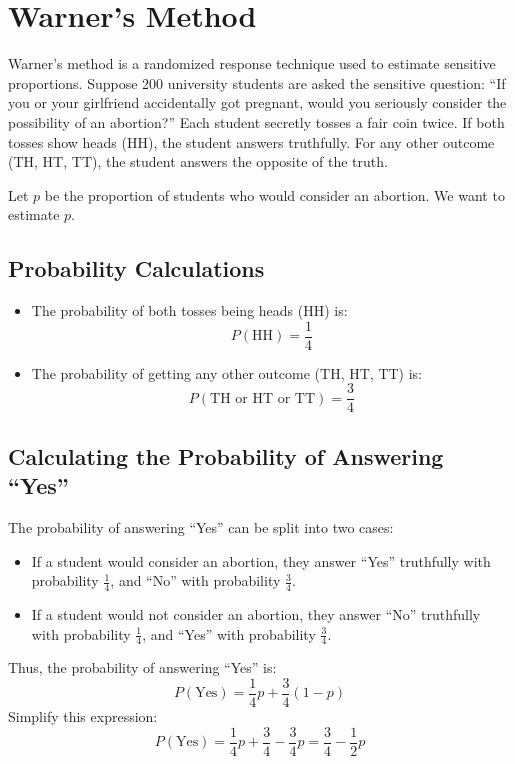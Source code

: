 \documentclass{article}
\begin{document}
\section*{Warner's Method}

Warner's method is a randomized response technique used to estimate sensitive proportions. Suppose 200 university students are asked the sensitive question: ``If you or your girlfriend accidentally got pregnant, would you seriously consider the possibility of an abortion?'' Each student secretly tosses a fair coin twice. If both tosses show heads (HH), the student answers truthfully. For any other outcome (TH, HT, TT), the student answers the opposite of the truth.

Let \( p \) be the proportion of students who would consider an abortion. We want to estimate \( p \).

\subsection*{Probability Calculations}

\begin{itemize}
    \item The probability of both tosses being heads (HH) is:
    \[
    P(\text{HH}) = \frac{1}{4}
    \]
    \item The probability of getting any other outcome (TH, HT, TT) is:
    \[
    P(\text{TH or HT or TT}) = \frac{3}{4}
    \]
\end{itemize}

\subsection*{Calculating the Probability of Answering ``Yes''}

The probability of answering ``Yes'' can be split into two cases:
\begin{itemize}
    \item If a student would consider an abortion, they answer ``Yes'' truthfully with probability \( \frac{1}{4} \), and ``No'' with probability \( \frac{3}{4} \).
    \item If a student would not consider an abortion, they answer ``No'' truthfully with probability \( \frac{1}{4} \), and ``Yes'' with probability \( \frac{3}{4} \).
\end{itemize}

Thus, the probability of answering ``Yes'' is:
\[
P(\text{Yes}) = \frac{1}{4}p + \frac{3}{4}(1 - p)
\]
Simplify this expression:
\[
P(\text{Yes}) = \frac{1}{4}p + \frac{3}{4} - \frac{3}{4}p = \frac{3}{4} - \frac{1}{2}p
\]
\end{document}

